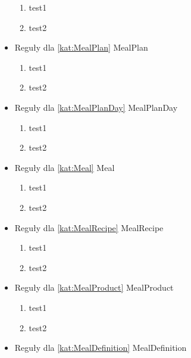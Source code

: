 \begin{itemize}[label={}]
    \begin{enumerate}[label={\textbf{REG/\protect\threedigits{\arabic{enumi}}}}, wide, labelwidth=!, resume]
        \item test1
        \item test2
    \end{enumerate}
    \item Reguły dla \ref{kat:MealPlan} MealPlan
    \begin{enumerate}[label={\textbf{REG/\protect\threedigits{\arabic{enumi}}}}, wide, labelwidth=!, resume]
        \item test1
        \item test2
    \end{enumerate}
    \item Reguły dla \ref{kat:MealPlanDay} MealPlanDay
    \begin{enumerate}[label={\textbf{REG/\protect\threedigits{\arabic{enumi}}}}, wide, labelwidth=!, resume]
        \item test1
        \item test2
    \end{enumerate}
    \item Reguły dla \ref{kat:Meal} Meal
    \begin{enumerate}[label={\textbf{REG/\protect\threedigits{\arabic{enumi}}}}, wide, labelwidth=!, resume]
        \item test1
        \item test2
    \end{enumerate}
    \item Reguły dla \ref{kat:MealRecipe} MealRecipe
    \begin{enumerate}[label={\textbf{REG/\protect\threedigits{\arabic{enumi}}}}, wide, labelwidth=!, resume]
        \item test1
        \item test2
    \end{enumerate}
    \item Reguły dla \ref{kat:MealProduct} MealProduct
    \begin{enumerate}[label={\textbf{REG/\protect\threedigits{\arabic{enumi}}}}, wide, labelwidth=!, resume]
        \item test1
        \item test2
    \end{enumerate}
    \item Reguły dla \ref{kat:MealDefinition} MealDefinition
    \begin{enumerate}[label={\textbf{REG/\protect\threedigits{\arabic{enumi}}}}, wide, labelwidth=!, resume]

\end{enumerate}
\end{itemize}
